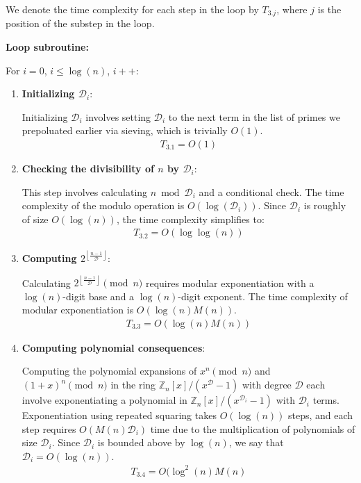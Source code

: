 \documentclass{article}
\theoremstyle{plain}
\theoremstyle{definition}
\newcommand{\floor}[1]{\left\lfloor #1 \right\rfloor}
\newcommand{\Z}{\mathbb{Z}}
\newcommand{\D}{\mathcal{D}}
\begin{document}
\begin{enumerate}[label*=\arabic*.]
    We denote the time complexity for each step in the loop by $T_{3.j}$, where $j$ is the position of the substep in the loop.

    \textbf{Loop subroutine:}
    
    For $i=0$, $i \leq \log(n)$, $i++$:
    \begin{enumerate}[label*=\arabic*.]
        \item \textbf{Initializing $\D_i$}:
        
        Initializing $\D_i$ involves setting $\D_i$ to the next term in the list of primes we prepoluated earlier via sieving, which is trivially $O(1)$.
        \begin{align}
            T_{3.1} = O(1)
        \end{align}
        
        \item \textbf{Checking the divisibility of $n$ by $\D_i$}:
        
        This step involves calculating $n \bmod{\D_i}$ and a conditional check. The time complexity of the modulo operation is $O(\log(\D_i))$. Since $\D_i$ is roughly of size $O(\log(n))$, the time complexity simplifies to:
        \begin{align}
            T_{3.2} = O(\log\log(n))
        \end{align}
        
        \item \textbf{Computing $2^{\floor{\frac{n-1}{\D}}}$}:
        
        Calculating $2^{\floor{\frac{n-1}{\D}}} \pmod{n}$ requires modular exponentiation with a $\log(n)$-digit base and a $\log(n)$-digit exponent. The time complexity of modular exponentiation is $O(\log(n) M(n))$.
        \begin{align}
            T_{3.3} = O(\log(n) M(n))
        \end{align}
        
        \item \textbf{Computing polynomial consequences}:
        
        Computing the polynomial expansions of $x^n \pmod{n}$ and $(1+x)^n \pmod{n}$ in the ring $\Z_n[x]/(x^\D-1)$ with degree $\D$ each involve exponentiating a polynomial in $\Z_n[x]/(x^{\D_i}-1)$ with $\D_i$ terms. Exponentiation using repeated squaring takes $O(\log(n))$ steps, and each step requires $O(M(n) \D_i)$ time due to the multiplication of polynomials of size $\D_i$. Since $\D_i$ is bounded above by $\log(n)$, we say that $\D_i = O(\log(n))$.
        \begin{align}
            T_{3.4} = O(\log^2(n) M(n)
        \end{align}
             

\end{enumerate}
\end{enumerate}
\end{document}

